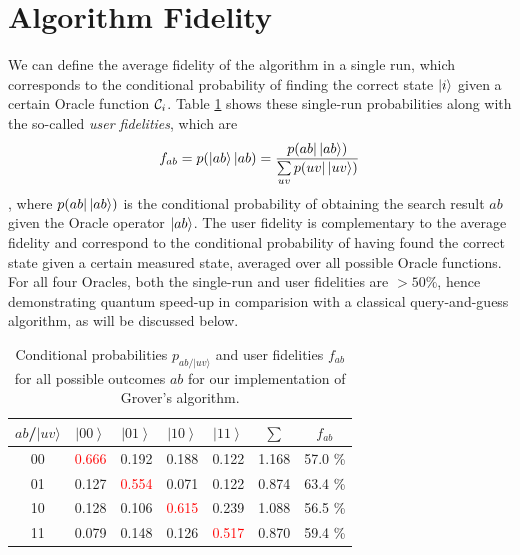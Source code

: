 \section{Algorithm Fidelity}

We can define the average fidelity of the algorithm in a single run, which corresponds to the conditional probability of finding the correct state $\left| i \right>$ given a certain Oracle function $\Or_i$.  Table \ref{tab:Probabilities-for-obtaining} shows these single-run probabilities along with the so-called {\it user fidelities}, which are
%
\begin{equation}
f_{ab} = p(\left| ab \right>|ab) = \frac{p(ab |\left| ab \right>)}{\sum\limits_{uv}p(uv|\left| uv \right>)} 
\end{equation}
%
, where $p(ab|\left| ab \right>)$ is the conditional probability of obtaining the search result $ab$ given the Oracle operator $\left| ab \right>$. The user fidelity is complementary to the average fidelity and correspond to the conditional probability of having found the correct state given a certain measured state, averaged over all possible Oracle functions. For all four Oracles, both the single-run and user fidelities are $> 50 \%$, hence demonstrating quantum speed-up in comparision with a classical query-and-guess algorithm, as will be discussed below.

\begin{table}[H]
\begin{centering}
\begin{tabular}{|c|c|c|c|c|c|c|}
\hline 
$ab$/$|uv\rangle$ & $\left|00\right\rangle $ & $\left|01\right\rangle $ & $\left|10\right\rangle $ & $\left|11\right\rangle $ & $\sum$ & $f_{ab}$\tabularnewline
\hline
\hline 
00 & \textcolor{red}{0.666} & 0.192 & 0.188 & 0.122 & 1.168 & 57.0 \%\tabularnewline
\hline 
01 & 0.127 & \textcolor{red}{0.554} & 0.071 & 0.122 & 0.874 & 63.4 \%\tabularnewline
\hline 
10 & 0.128 & 0.106 & \textcolor{red}{0.615} & 0.239 & 1.088 & 56.5 \%\tabularnewline
\hline 
11 & 0.079 & 0.148 & 0.126 & \textcolor{red}{0.517} & 0.870 & 59.4 \%\tabularnewline
\hline
\end{tabular}
\par\end{centering}

\caption{\label{tab:Probabilities-for-obtaining}Conditional probabilities
$p_{ab/|uv\rangle}$ and user fidelities $f_{ab}$ for all
possible outcomes $ab$ for our implementation of Grover's algorithm.}

\end{table}

